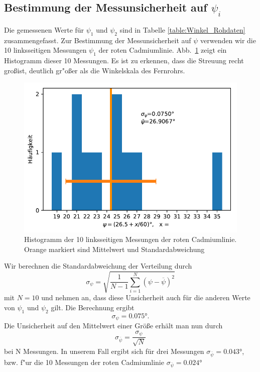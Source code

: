 \documentclass[12pt,a4paper]{article}
\begin{document}
\subsection{Bestimmung der Messunsicherheit auf  $\psi_i$}
Die gemessenen Werte für $\psi_{1}$ und $\psi_2$ sind in Tabelle \ref{table:Winkel_Rohdaten} zusammengefasst. Zur Bestimmung der Messunsicherheit auf $\psi$ verwenden wir die 10 linksseitigen Messungen $\psi_1$ der roten Cadmiumlinie. Abb.~\ref{Histogramm} zeigt ein Histogramm dieser 10 Messungen. Es ist zu erkennen, dass die Streuung recht gro\ss  ist, deutlich gr"o\ss er als die Winkelskala des Fernrohrs.
\begin{figure}[H]
	\centering
	\includegraphics[width=0.6\linewidth]{Python/Histogramm_Psi.pdf}
	\caption{Histogramm der 10 linksseitigen Messungen der roten Cadmiumlinie. Orange markiert sind Mittelwert und Standardabweichung}
	\label{Histogramm}
\end{figure}
Wir berechnen die Standardabweichung der Verteilung durch
\begin{equation}
\sigma_{\psi}=\sqrt{\frac{1}{N-1}\sum^{N}_{i=1}{(\psi-\overline{\psi})^2}}
\end{equation}
mit $N=10$ und nehmen an, dass diese Unsicherheit auch für die anderen Werte von $\psi_1$ und $\psi_2$ gilt. Die Berechnung ergibt
\begin{equation}
\sigma_{\psi}=\ang{0.075}.
\end{equation}
Die Unsicherheit auf den Mittelwert einer Größe erhält man nun durch
\begin{equation}
\sigma_{\overline{\psi}}=\frac{\sigma_{\psi}}{\sqrt{N}}
\end{equation}
bei N Messungen.  In unserem Fall ergibt sich für drei Messungen $\sigma_{\overline{\psi}}=\ang{0.043}$, bzw. f"ur die 10 Messungen der roten Cadmiumlinie $\sigma_{\overline{\psi}}=\ang{0.024}$
\end{document}
